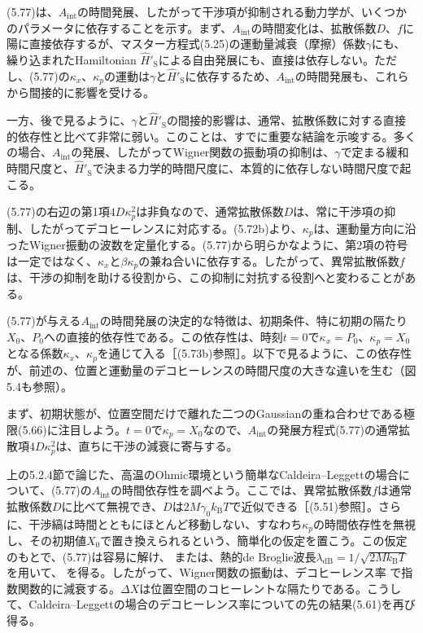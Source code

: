 (5.77)は、$A_{\mathrm{int}}$の時間発展、したがって干渉項が抑制される動力学が、いくつかのパラメータに依存することを示す。まず、$A_{\mathrm{int}}$の時間変化は、拡散係数$D$、$f$に陽に直接依存するが、マスター方程式(5.25)の運動量減衰（摩擦）係数$\gamma$にも、繰り込まれたHamiltonian $\hat H'_{\mathrm S}$による自由発展にも、直接は依存しない。ただし、(5.77)の$\kappa_x$、$\kappa_p$の運動は$\gamma$と$\hat H'_{\mathrm S}$に依存するため、$A_{\mathrm{int}}$の時間発展も、これらから間接的に影響を受ける。

一方、後で見るように、$\gamma$と$\hat H'_{\mathrm S}$の間接的影響は、通常、拡散係数に対する直接的依存性と比べて非常に弱い。このことは、すでに重要な結論を示唆する。多くの場合、$A_{\mathrm{int}}$の発展、したがってWigner関数の振動項の抑制は、$\gamma$で定まる緩和時間尺度と、$\hat H'_{\mathrm S}$で決まる力学的時間尺度に、本質的に依存しない時間尺度で起こる。

(5.77)の右辺の第1項$4D\kappa_p^2$は非負なので、通常拡散係数$D$は、常に干渉項の抑制、したがってデコヒーレンスに対応する。(5.72b)より、$\kappa_p$は、運動量方向に沿ったWigner振動の波数を定量化する。(5.77)から明らかなように、第2項の符号は一定ではなく、$\kappa_x$と$\beta\kappa_p$の兼ね合いに依存する。したがって、異常拡散係数$f$は、干渉の抑制を助ける役割から、この抑制に対抗する役割へと変わることがある。

\hypertarget{srcpage:200}{}\label{srcpage:200}
(5.77)が与える$A_{\mathrm{int}}$の時間発展の決定的な特徴は、初期条件、特に初期の隔たり$X_0$、$P_0$への直接的依存性である。この依存性は、時刻$t=0$で$\kappa_x=P_0$、$\kappa_p=X_0$となる係数$\kappa_x$、$\kappa_p$を通じて入る［(5.73b)参照］。以下で見るように、この依存性が、前述の、位置と運動量のデコヒーレンスの時間尺度の大きな違いを生む（図5.4も参照）。

まず、初期状態が、位置空間だけで離れた二つのGaussianの重ね合わせである極限(5.66)に注目しよう。$t=0$で$\kappa_p=X_0$なので、$A_{\mathrm{int}}$の発展方程式(5.77)の通常拡散項$4D\kappa_p^2$は、直ちに干渉の減衰に寄与する。

上の5.2.4節で論じた、高温のOhmic環境という簡単なCaldeira--Leggettの場合について、(5.77)の$A_{\mathrm{int}}$の時間依存性を調べよう。ここでは、異常拡散係数$f$は通常拡散係数$D$に比べて無視でき、$D$は$2M\gamma_0k_{\mathrm B}T$で近似できる［(5.51)参照］。さらに、干渉縞は時間とともにほとんど移動しない、すなわち$\kappa_p$の時間依存性を無視し、その初期値$X_0$で置き換えられるという、簡単化の仮定を置こう。この仮定のもとで、(5.77)は容易に解け、
または、熱的de Broglie波長$\lambda_{\mathrm{dB}}=1/\sqrt{2Mk_{\mathrm B}T}$を用いて、
を得る。したがって、Wigner関数の振動は、デコヒーレンス率
で指数関数的に減衰する。$\Delta X$は位置空間のコヒーレントな隔たりである。こうして、Caldeira--Leggettの場合のデコヒーレンス率についての先の結果(5.61)を再び得る。

